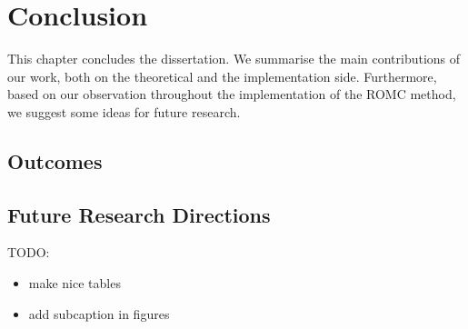 \documentclass[11pt,twoside]{article}
\numberwithin{Theorem}{section}
\numberwithin{Definition}{section}
\numberwithin{Lemma}{section}
\numberwithin{Algorithm}{section}
\numberwithin{equation}{section}
\begin{document}
\section{Conclusion}

This chapter concludes the dissertation. We summarise the main
contributions of our work, both on the theoretical and the
implementation side. Furthermore, based on our observation throughout
the implementation of the ROMC method, we suggest some ideas for
future research.

\subsection{Outcomes}
\label{subsec:outcomes}


\subsection{Future Research Directions}
\label{subsec:future}

\clearpage

TODO:

\begin{itemize}
\item make nice tables
\item add subcaption in figures
\end{itemize}

\printbibliography
\clearpage




\end{document}
